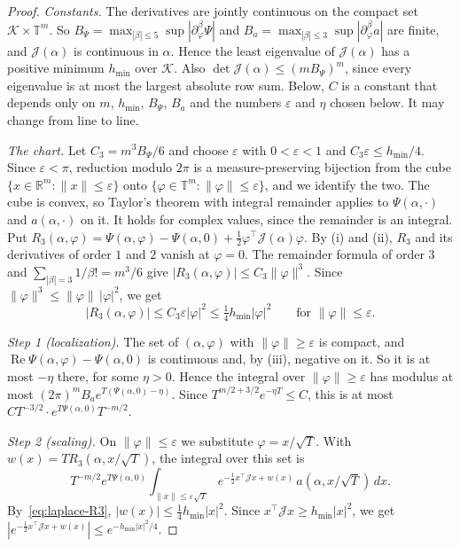 \begin{proof}
\emph{Constants.} The derivatives are jointly continuous on the compact set
$\mathcal K\times\mathbb T^m$. So
$B_\Psi=\max_{|\beta|\le5}\sup|\partial^\beta_\varphi\Psi|$ and
$B_a=\max_{|\beta|\le3}\sup|\partial^\beta_\varphi a|$ are finite, and
$\mathcal J(\alpha)$ is continuous in $\alpha$. Hence the least eigenvalue of
$\mathcal J(\alpha)$ has a positive minimum $h_{\min}$ over $\mathcal K$.
Also $\det\mathcal J(\alpha)\le(mB_\Psi)^m$, since every eigenvalue is at
most the largest absolute row sum. Below, $C$ is a constant that depends only
on $m$, $h_{\min}$, $B_\Psi$, $B_a$ and the numbers $\varepsilon$ and $\eta$
chosen below. It may change from line to line.

\emph{The chart.} Let $C_3=m^3B_\Psi/6$ and choose $\varepsilon$ with
$0<\varepsilon<1$ and $C_3\varepsilon\le h_{\min}/4$. Since $\varepsilon<\pi$,
reduction modulo $2\pi$ is a measure-preserving bijection from the cube
$\{x\in\mathbb R^m:\lVert x\rVert\le\varepsilon\}$ onto
$\{\varphi\in\mathbb T^m:\lVert\varphi\rVert\le\varepsilon\}$, and we identify
the two. The cube is convex, so Taylor's theorem with integral remainder
applies to $\Psi(\alpha,\cdot)$ and $a(\alpha,\cdot)$ on it. It holds for
complex values, since the remainder is an integral. Put
$R_3(\alpha,\varphi)=\Psi(\alpha,\varphi)-\Psi(\alpha,0)
+\frac12\varphi^\top\mathcal J(\alpha)\varphi$. By (i) and (ii), $R_3$ and its
derivatives of order $1$ and $2$ vanish at $\varphi=0$. The remainder formula
of order $3$ and $\sum_{|\beta|=3}1/\beta!=m^3/6$ give
$|R_3(\alpha,\varphi)|\le C_3\lVert\varphi\rVert^3$. Since
$\lVert\varphi\rVert^3\le\lVert\varphi\rVert\,|\varphi|^2$, we get
\begin{equation}\label{eq:laplace-R3}
|R_3(\alpha,\varphi)|\le C_3\varepsilon|\varphi|^2\le\tfrac14h_{\min}|\varphi|^2
\qquad\text{for }\lVert\varphi\rVert\le\varepsilon .
\end{equation}

\emph{Step 1 (localization).} The set of $(\alpha,\varphi)$ with
$\lVert\varphi\rVert\ge\varepsilon$ is compact, and
$\operatorname{Re}\Psi(\alpha,\varphi)-\Psi(\alpha,0)$ is continuous and, by
(iii), negative on it. So it is at most $-\eta$ there, for some $\eta>0$. Hence
the integral over $\lVert\varphi\rVert\ge\varepsilon$ has modulus at most
$(2\pi)^mB_ae^{T(\Psi(\alpha,0)-\eta)}$. Since
$T^{m/2+3/2}e^{-\eta T}\le C$, this is at most
$CT^{-3/2}\cdot e^{T\Psi(\alpha,0)}T^{-m/2}$.

\emph{Step 2 (scaling).} On $\lVert\varphi\rVert\le\varepsilon$ we substitute
$\varphi=x/\sqrt T$. With $w(x)=TR_3(\alpha,x/\sqrt T)$, the integral over
this set is
\[
T^{-m/2}e^{T\Psi(\alpha,0)}\int_{\lVert x\rVert\le\varepsilon\sqrt T}
e^{-\frac12x^\top\mathcal Jx+w(x)}\,a(\alpha,x/\sqrt T)\,dx .
\]
By~\eqref{eq:laplace-R3}, $|w(x)|\le\frac14h_{\min}|x|^2$. Since
$x^\top\mathcal Jx\ge h_{\min}|x|^2$, we get
$|e^{-\frac12x^\top\mathcal Jx+w(x)}|\le e^{-h_{\min}|x|^2/4}$.


\end{proof}
